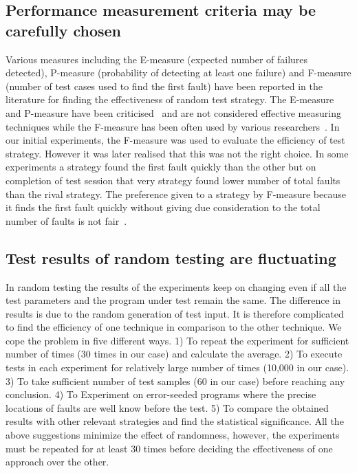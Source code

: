  
\subsection{Performance measurement criteria may be carefully chosen}
Various measures including the E-measure (expected number of failures detected), P-measure (probability of detecting at least one failure) and F-measure (number of test cases used to find the first fault) have been reported in the literature for finding the effectiveness of random test strategy. The E-measure and P-measure have been criticised~\cite{chen2005adaptive} and are not considered effective measuring techniques while the F-measure has been often used by various researchers~\cite{chen2004statistical, chen1996expected}. In our initial experiments, the F-measure was used to evaluate the efficiency of test strategy. However it was later realised that this was not the right choice. In some experiments a strategy found the first fault quickly than the other but on completion of test session that very strategy found lower number of total faults than the rival strategy. The preference given to a strategy by F-measure because it finds the first fault quickly without giving due consideration to the total number of faults is not fair~\cite{liu2012comparison}.

\subsection{Test results of random testing are fluctuating} 
In random testing the results of the experiments keep on changing even if all the test parameters and the program under test remain the same. The difference in results is due to the random generation of test input. It is therefore complicated to find the efficiency of one technique in comparison to the other technique. We cope the problem in five different ways. 1) To repeat the experiment for sufficient number of times (30 times in our case) and calculate the average. 2) To execute tests in each experiment for relatively large number of times (10,000 in our case). 3) To take sufficient number of test samples (60 in our case) before reaching any conclusion. 4) To Experiment on error-seeded programs where the precise locations of faults are well know before the test. 5) To compare the obtained results with other relevant strategies and find the statistical significance. All the above suggestions minimize the effect of randomness, however, the experiments must be repeated for at least 30 times before deciding the effectiveness of one approach over the other.

